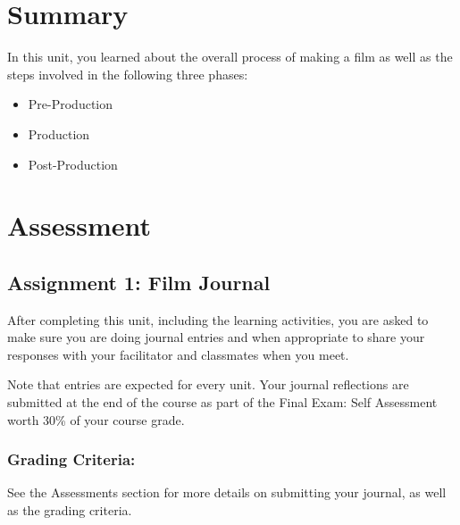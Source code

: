 \documentclass[
]{book}
\providecommand{\tightlist}{%
  \setlength{\itemsep}{0pt}\setlength{\parskip}{0pt}}
\begin{document}
\hypertarget{summary-1}{%
\section*{Summary}\label{summary-1}}

In this unit, you learned about the overall process of making a film as well as the steps involved in the following three phases:

\begin{itemize}
\tightlist
\item
  Pre-Production\\
\item
  Production\\
\item
  Post-Production
\end{itemize}

\hypertarget{assessment-1}{%
\section*{Assessment}\label{assessment-1}}

\begin{assessment}
\hypertarget{assignment-1-film-journal}{%
\subsection*{Assignment 1: Film Journal}\label{assignment-1-film-journal}}

After completing this unit, including the learning activities, you are asked to make sure you are doing journal entries and when appropriate to share your responses with your facilitator and classmates when you meet.

Note that entries are expected for every unit. Your journal reflections are submitted at the end of the course as part of the Final Exam: Self Assessment worth 30\% of your course grade.

\hypertarget{grading-criteria-1}{%
\subsubsection*{Grading Criteria:}\label{grading-criteria-1}}

See the Assessments section for more details on submitting your journal, as well as the grading criteria.
\end{assessment}
\end{document}
